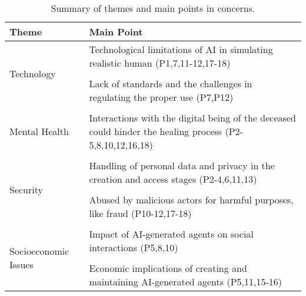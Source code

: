 \begin{table*}[htbp]
  \caption{Summary of themes and main points in concerns.}
  \label{tab:summary of themes and main points in concerns}
  \begin{tabular}{p{}p{}}
    \toprule
    \textbf{Theme} & \textbf{Main Point} \\
    \midrule
    \multirow{3}{=}{Technology} 
             & Technological limitations of AI in simulating realistic human (P1,7,11-12,17-18)  \\ %
             & \cellcolor{gray!15}{Unpredictability and potential loss of control over AI systems (P9-11,13)} \\ %
             & Lack of standards and the challenges in regulating the proper use (P7,P12)  \\ 
    \hline
    \multirow{3}{=}{Mental Health}
            & \cellcolor{gray!15}{The blending of real and virtual worlds could evoke feelings of fear and discomfort (P5,7-8,16)} \\ %
            & Interactions with the digital being of the deceased could hinder the healing process (P2-5,8,10,12,16,18) \\ %
            & \cellcolor{gray!15}{Design technology features that encourage moderation in interactions and move on  (P2,12,16,18)} \\
    \hline
    \multirow{3}{=}{Security}
            & Handling of personal data and privacy in the creation and access stages (P2-4,6,11,13) \\ %
            & \cellcolor{gray!15}{AI-generated agents negatively impact reputation (P11, 13-14, 16-17)}  \\ %
            & Abused by malicious actors for harmful purposes, like fraud (P10-12,17-18) \\ 
            & \cellcolor{gray!15}{Abused by service providers without proper oversight (P1,2)} \\
    \hline
    \multirow{3}{=}{Socioeconomic Issues}
            & Impact of AI-generated agents on social interactions (P5,8,10) \\ %
            & \cellcolor{gray!15}{Impact traditional cultural practices surrounding death and mourning (P6,9,16)} \\ %
            & Economic implications of creating and maintaining AI-generated agents (P5,11,15-16) \\
    \bottomrule
  \end{tabular}
\end{table*}

